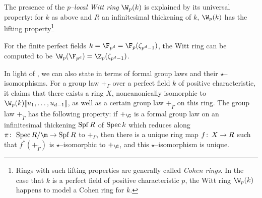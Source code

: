 \begin{remark}\label{UnivPropertyOfWittRing}
The presence of the \textit{\(p\)--local Witt ring} \(\W_p(k)\) is explained by its universal property: for \(k\) as above and \(R\) an infinitesimal thickening of \(k\), \(\W_p(k)\) has the lifting property\footnote{Rings with such lifting properties are generally called \textit{Cohen rings}.  In the case that \(k\) is a perfect field of positive characteristic \(p\), the Witt ring \(\W_p(k)\) happens to model a Cohen ring for \(k\).}
\begin{center}
\end{center}
For the finite perfect fields \(k = \F_{p^d} = \F_p(\zeta_{p^d-1})\), the Witt ring can be computed to be \(\W_p(\F_{p^d}) = \Z_p(\zeta_{p^d-1})\).
\end{remark}

\begin{remark}\label{LubinTateModuliThmInFGLTerms}
In light of , we can also state  in terms of formal group laws and their \(\star\)--isomorphisms.  For a group law \(+_\Gamma\) over a perfect field \(k\) of positive characteristic, it claims that there exists a ring \(X\), noncanonically isomorphic to \(\W_p(k)\ps{u_1, \ldots, u_{d-1}}\), as well as a certain group law \(+_{\widetilde \Gamma}\) on this ring.  The group law \(+_{\widetilde \Gamma}\) has the following property: if \(+_\G\) is a formal group law on an infinitesimal thickening \(\operatorname{Spf} R\) of \(\operatorname{Spec} k\) which reduces along \(\pi\co \Spec R/\m \to \Spf R\) to \(+_\Gamma\), then there is a unique ring map \(f\colon\thinspace X \to R\) such that \(f^* (+_{\widetilde \Gamma})\) is \(\star\)--isomorphic to \(+_{\G}\), and this \(\star\)--isomorphism is unique.
\end{remark}

